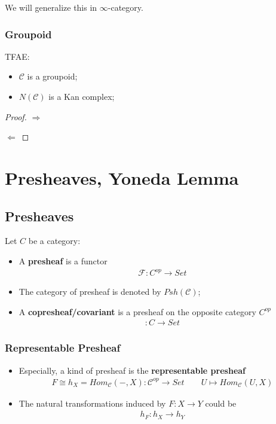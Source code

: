 \documentclass[Total.tex]{subfiles}
\begin{document}
			We will generalize this in $\infty$-category.
			
			\subsection{Groupoid}
				\begin{theorem}
					TFAE:
					\begin{itemize}
						\item $\mathcal{C}$ is a groupoid;
						\item $N(\mathcal{C})$ is a Kan complex;
					\end{itemize}
				\end{theorem}
				\begin{proof}
					$\Rightarrow$
					
					$\Leftarrow$
				\end{proof}
	\chapter{Presheaves, Yoneda Lemma}
		\section{Presheaves}
			\begin{Def}
				Let $C$ be a category:
				\begin{itemize}
					\item A \textbf{presheaf} is a functor
					\begin{gather*}
						\mathscr{F}:C^{op}\rightarrow Set
					\end{gather*}
					\item The category of presheaf is denoted by $Psh(\mathcal{C})$;
					\item A \textbf{copresheaf/covariant} is a presheaf on the opposite category $C^{op}$
					\begin{gather*}
						\mathscr:C\rightarrow Set
					\end{gather*}
				\end{itemize}
			\end{Def}
			\subsection{Representable Presheaf}
				\begin{Def}
					\begin{itemize}
						\item 
						Especially, a kind of presheaf is the \textbf{representable presheaf}
						\begin{gather*}
							F\cong h_X=Hom_\mathcal{C}(-,X):\mathcal{C}^{op}\rightarrow Set\qquad U\mapsto Hom_\mathcal{C}(U,X)
						\end{gather*}
						\item The natural transformations induced by $F:X\rightarrow Y$ could be
						\begin{gather*}
							h_F:h_X\rightarrow h_Y
						\end{gather*}
					\end{itemize}
				\end{Def}
				
\end{document}
